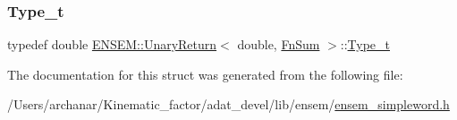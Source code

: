 \subsubsection{\texorpdfstring{Type\_t}{Type\_t}\hspace{0.1cm}{\footnotesize\ttfamily [2/2]}}
{\footnotesize\ttfamily typedef double \mbox{\hyperlink{structENSEM_1_1UnaryReturn}{E\+N\+S\+E\+M\+::\+Unary\+Return}}$<$ double, \mbox{\hyperlink{structENSEM_1_1FnSum}{Fn\+Sum}} $>$\+::\mbox{\hyperlink{structENSEM_1_1UnaryReturn_3_01double_00_01FnSum_01_4_ad107c064fb27f30146a624a7378978bb}{Type\+\_\+t}}}



The documentation for this struct was generated from the following file\+:\begin{DoxyCompactItemize}
\item 
/\+Users/archanar/\+Kinematic\+\_\+factor/adat\+\_\+devel/lib/ensem/\mbox{\hyperlink{lib_2ensem_2ensem__simpleword_8h}{ensem\+\_\+simpleword.\+h}}\end{DoxyCompactItemize}
